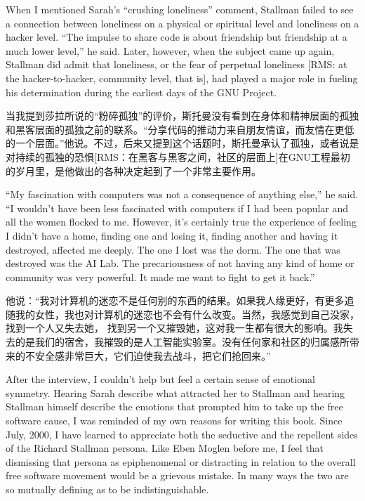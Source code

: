 \ifdefined\eng
When I mentioned Sarah's ``crushing loneliness'' comment, Stallman failed to see a connection between loneliness on a physical or spiritual level and loneliness on a hacker level. ``The impulse to share code is about friendship but friendship at a much lower level,'' he said. Later, however, when the subject came up again, Stallman did admit that loneliness, or the fear of perpetual loneliness [RMS: at the hacker-to-hacker, community level, that is], had played a major role in fueling his determination during the earliest days of the GNU Project.
\fi

\ifdefined\chs
当我提到莎拉所说的“粉碎孤独”的评价，斯托曼没有看到在身体和精神层面的孤独和黑客层面的孤独之前的联系。“分享代码的推动力来自朋友情谊，而友情在更低的一个层面。”他说。不过，后来又提到这个话题时，斯托曼承认了孤独，或者说是对持续的孤独的恐惧[RMS：在黑客与黑客之间，社区的层面上]在GNU工程最初的岁月里，是他做出的各种决定起到了一个非常主要作用。
\fi

\ifdefined\eng
``My fascination with computers was not a consequence of anything else,'' he said. ``I wouldn't have been less fascinated with computers if I had been popular and all the women flocked to me. However, it's certainly true the experience of feeling I didn't have a home, finding one and losing it, finding another and having it destroyed, affected me deeply. The one I lost was the dorm. The one that was destroyed was the AI Lab. The precariousness of not having any kind of home or community was very powerful. It made me want to fight to get it back.''
\fi

\ifdefined\chs
他说：“我对计算机的迷恋不是任何别的东西的结果。如果我人缘更好，有更多追随我的女性，我也对计算机的迷恋也不会有什么改变。当然，我感觉到自己没家，找到一个人又失去她， 找到另一个又摧毁她，这对我一生都有很大的影响。我失去的是我们的宿舍，我摧毁的是人工智能实验室。没有任何家和社区的归属感所带来的不安全感非常巨大，它们迫使我去战斗，把它们抢回来。”
\fi

\ifdefined\eng
After the interview, I couldn't help but feel a certain sense of emotional symmetry. Hearing Sarah describe what attracted her to Stallman and hearing Stallman himself describe the emotions that prompted him to take up the free software cause, I was reminded of my own reasons for writing this book. Since July, 2000, I have learned to appreciate both the seductive and the repellent sides of the Richard Stallman persona. Like Eben Moglen before me, I feel that dismissing that persona as epiphenomenal or distracting in relation to the overall free software movement would be a grievous mistake. In many ways the two are so mutually defining as to be indistinguishable.
\fi

